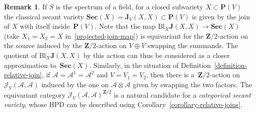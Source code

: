 \documentclass[11pt, reqno]{amsart}
\numberwithin{equation}{section}
\theoremstyle{plain}
\theoremstyle{definition}
\newtheorem{remark}[theorem]{Remark}
\newcommand{\Sec}{\mathbf{Sec}}
\newcommand{\Bl}{\mathrm{Bl}}
\newcommand{\cA}{\mathcal{A}}
\newcommand{\cJ}{\mathcal{J}}
\newcommand{\bJ}{\mathbf{J}}
\newcommand{\bZ}{\mathbf{Z}}
\newcommand{\bP}{\mathbf{P}}
\begin{document}
\begin{remark}
If $S$ is the spectrum of a field, 
for a closed subvariety $X \subset \bP(V)$ 
the classical secant variety $\Sec(X) = \bJ_V(X, X) \subset \bP(V)$ 
is given by the join of $X$ with itself inside~$\bP(V)$. 
Note that the map $\Bl_{X} \bJ(X, X) \to \Sec(X)$ (take $X_1 = X_2 = X$ in~\eqref{projected-join-map}) 
is equivariant for the $\bZ/2$-action on the source induced by 
the $\bZ/2$-action on $V \oplus V$ swapping the summands. 
The quotient of $\Bl_{X} \bJ(X, X)$ by this action can thus be considered as a closer 
approximation to~$\Sec(X)$. 
Similarly, in the situation of Definition~\ref{definition-relative-join}, if 
$\cA = \cA^1 = \cA^2$ and $V = V_1 = V_2$, then there is a~$\bZ/2$-action on 
$\cJ_V(\cA, \cA)$ induced by the one on $\cA \otimes \cA$ given by swapping the 
two factors. 
The equivariant category $\cJ_V(\cA, \cA)^{\bZ/2}$ is a natural candidate for a 
\emph{categorical secant variety}, whose HPD can be described using Corollary~\ref{corollary-relative-joins}.
\end{remark}



\end{document}
